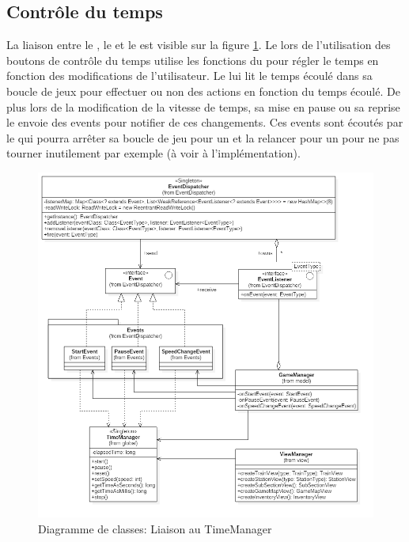 \documentclass[report, backcover, french, nodocumentinfo]{upmethodology-document}
\begin{document}
			\subsection{Contrôle du temps}\label{timeControl}
				La liaison entre le , le  et le  est visible sur la figure \ref{fig:TimeManagerLinkClassDiagram}. Le  lors de l'utilisation des boutons de contrôle du temps utilise les fonctions du  pour régler le temps en fonction des modifications de l'utilisateur. Le  lui lit le temps écoulé dans sa boucle de jeux pour effectuer ou non des actions en fonction du temps écoulé. De plus lors de la modification de la vitesse de temps, sa mise en pause ou sa reprise le  envoie des events pour notifier de ces changements. Ces events sont écoutés par le  qui pourra arrêter sa boucle de jeu pour un  et la relancer pour un  pour ne pas tourner inutilement par exemple (à voir à l'implémentation).
				\begin{figure}[h!]
					\centering
					\includegraphics[width=\textwidth]{figures/TimeManagerLinkClassDiagram}
					\caption{Diagramme de classes: Liaison au TimeManager}
					\label{fig:TimeManagerLinkClassDiagram}
				\end{figure}
\end{document}
